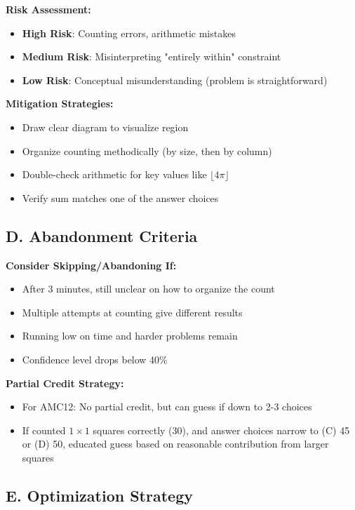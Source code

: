 \documentclass[12pt]{article}
\begin{document}
\begin{competitionbox}
\textbf{Risk Assessment:}
\begin{itemize}
    \item \textbf{High Risk}: Counting errors, arithmetic mistakes
    \item \textbf{Medium Risk}: Misinterpreting "entirely within" constraint
    \item \textbf{Low Risk}: Conceptual misunderstanding (problem is straightforward)
\end{itemize}

\textbf{Mitigation Strategies:}
\begin{itemize}
    \item Draw clear diagram to visualize region
    \item Organize counting methodically (by size, then by column)
    \item Double-check arithmetic for key values like $\lfloor 4\pi \rfloor$
    \item Verify sum matches one of the answer choices
\end{itemize}

\subsection*{D. Abandonment Criteria}

\textbf{Consider Skipping/Abandoning If:}
\begin{itemize}
    \item After 3 minutes, still unclear on how to organize the count
    \item Multiple attempts at counting give different results
    \item Running low on time and harder problems remain
    \item Confidence level drops below 40\%
\end{itemize}

\textbf{Partial Credit Strategy:}
\begin{itemize}
    \item For AMC12: No partial credit, but can guess if down to 2-3 choices
    \item If counted $1 \times 1$ squares correctly (30), and answer choices narrow to (C) 45 or (D) 50, educated guess based on reasonable contribution from larger squares
\end{itemize}

\subsection*{E. Optimization Strategy}


\end{competitionbox}
\end{document}
